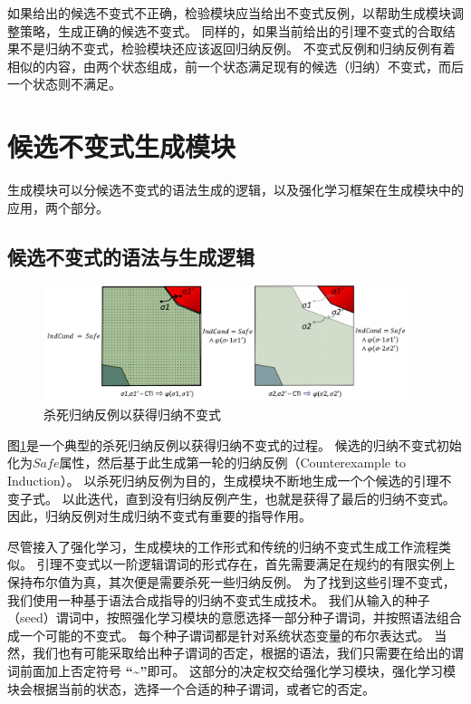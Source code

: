 如果给出的候选不变式不正确，检验模块应当给出不变式反例，以帮助生成模块调整策略，生成正确的候选不变式。
同样的，如果当前给出的引理不变式的合取结果不是归纳不变式，检验模块还应该返回归纳反例。
不变式反例和归纳反例有着相似的内容，由两个状态组成，前一个状态满足现有的候选（归纳）不变式，而后一个状态则不满足。

\section{候选不变式生成模块}
生成模块可以分候选不变式的语法生成的逻辑，以及强化学习框架在生成模块中的应用，两个部分。
\subsection{候选不变式的语法与生成逻辑}
\begin{figure}[h]
    \centering
    \includegraphics[width=0.95\textwidth]{figures/eliminate_cti.pdf}
    \caption{杀死归纳反例以获得归纳不变式}
    \label{fig:eliminate_cti}
\end{figure}

图\ref{fig:eliminate_cti}是一个典型的杀死归纳反例以获得归纳不变式的过程。
候选的归纳不变式初始化为$Safe$属性，然后基于此生成第一轮的归纳反例（Counterexample to Induction）。
以杀死归纳反例为目的，生成模块不断地生成一个个候选的引理不变子式。
以此迭代，直到没有归纳反例产生，也就是获得了最后的归纳不变式。
因此，归纳反例对生成归纳不变式有重要的指导作用。

尽管接入了强化学习，生成模块的工作形式和传统的归纳不变式生成工作流程类似。
引理不变式以一阶逻辑谓词的形式存在，首先需要满足在规约的有限实例上保持布尔值为真，其次便是需要杀死一些归纳反例。
为了找到这些引理不变式，我们使用一种基于语法合成指导的归纳不变式生成技术。
我们从输入的种子（seed）谓词中，按照强化学习模块的意愿选择一部分种子谓词，并按照语法组合成一个可能的不变式。
每个种子谓词都是针对系统状态变量的布尔表达式。
当然，我们也有可能采取给出种子谓词的否定，根据\TLA 的语法，我们只需要在给出的谓词前面加上否定符号 \textbf{“\~{}”}即可。
这部分的决定权交给强化学习模块，强化学习模块会根据当前的状态，选择一个合适的种子谓词，或者它的否定。

